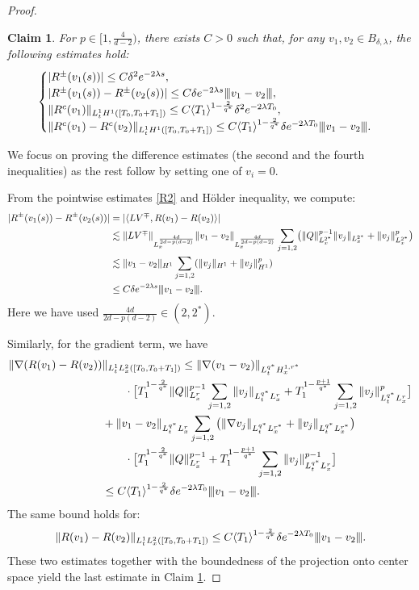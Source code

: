 \documentclass[12pt]{amsart}
\newcommand{\vertiii}[1]{{\left\vert\kern-0.25ex\left\vert\kern-0.25ex\left\vert #1 
    \right\vert\kern-0.25ex\right\vert\kern-0.25ex\right\vert}}
\newtheorem{claim}[theorem]{Claim}
\begin{document}
\begin{proof}
\begin{claim}\label{JJ3} For $p \in [1, \frac 4{d-2})$, there exists $C>0$ such that, for any $v_1, v_2 \in B_{\delta, \lambda}$, the following estimates hold:
\begin{align*}
\begin{cases}
|R^{\pm}(v_1(s))|\le C\delta^2 e^{-2\lambda s},\\
|R^{\pm}(v_1(s))-R^{\pm}(v_2(s))|\le C \delta e^{-2\lambda s}\vertiii{v_1-v_2},\\
\|R^c(v_1)\|_{L_t^1 H^1([T_0, T_0+T_1])}\le C\langle T_1\rangle^{1-\frac 2{q^*}}\delta^2 e^{-2\lambda T_0}, \\
\|R^c(v_1)-R^c(v_2)\|_{L_t^1 H^1([T_0, T_0+T_1])}\le C\langle T_1\rangle ^{1-\frac 2{q^*}}\delta e^{-2\lambda T_0}
\vertiii{v_1-v_2}. 
\end{cases}
\end{align*}
\end{claim}
We focus on proving the difference estimates (the second and the fourth inequalities) as the rest follow by setting one of $v_i=0$. 

From the pointwise estimates \eqref{R2} and H\"older inequality, we compute: 
\begin{align*}
|R^{\pm}(v_1(s))-R^{\pm}(v_2(s))|&=|\langle LV^{\mp}, R(v_1)-R(v_2)\rangle |\\
&\lesssim  \|LV^{\mp}\|_{L_x^{\frac{4d}{2d-p(d-2)}}}\|v_1-v_2\|_{L_x^{\frac{4d}{2d-p(d-2)}}} \sum_{j=1,2}\bigl(\|Q\|_{L_x^{2^*}}^{p-1}\|v_j\|_{L_x^{2^*}}+\|v_j\|_{L_x^{2^*}}^p\bigr)
\\
&\lesssim \|v_1-v_2\|_{H^1}\sum_{j=1,2}( \|v_j\|_{H^1}+\|v_j\|_{H^1}^p)\\
&\le C \delta e^{-2\lambda s}\vertiii{v_1-v_2}. 
\end{align*}
Here we have used $\frac{4d}{2d-p(d-2)} \in (2, 2^*)$.


Similarly, for the gradient term, we have
\begin{align}
\|\nabla(R(v_1)-R(v_2))&\|_{L_t^1 L_x^2([T_0,T_0+T_1])}\le \|\nabla(v_1-v_2)\|_{L_t^{q^*}H_x^{1, r^*}}\label{525}\\
&\qquad\cdot\bigl[
T_1^{1-\frac 2{q^*}}\|Q\|_{L_x^{r}}^{p-1}\sum_{j=1,2}\|v_j\|_{L_t^{q^*}L_x^r}
+T_1^{1-\frac {p+1}{q^*}}\sum_{j=1,2}\|v_j\|_{L_t^{q^*}L_x^r}^p\bigr]\notag\\
&+\|v_1-v_2\|_{L_t^{q^*}L_x^{r}}\sum_{j=1,2} \big( \|\nabla v_j\|_{L_t^{q^*}L_x^{r^*}} +  \|v_j\|_{L_t^{q^*}L_x^{r^*}}  \big) \notag\\
&\qquad\cdot\bigl[T_1^{1-\frac 2{q^*}}\|Q\|_{L_x^{r}}^{p-1}+T_1^{1-\frac {p+1}{q^*}}
\sum_{j=1,2}\|v_j\|_{L_t^{q^*}L_x^r}^{p-1}\bigr]\notag\\
&\le C\langle T_1\rangle^{1-\frac {2}{q^*}}\delta e^{-2\lambda T_0}\vertiii{v_1-v_2}. \notag
\end{align}
The same bound holds for: 
\[
\|R(v_1)-R(v_2)\|_{L_t^1L_x^2([T_0, T_0+T_1])}\le C\langle T_1\rangle^{1-\frac {2}{q^*}}\delta e^{-2\lambda T_0}\vertiii{v_1-v_2}.
\]
These two estimates together with the boundedness of the projection onto center space yield the last estimate in Claim \ref{JJ3}.


\end{proof}
\end{document}
